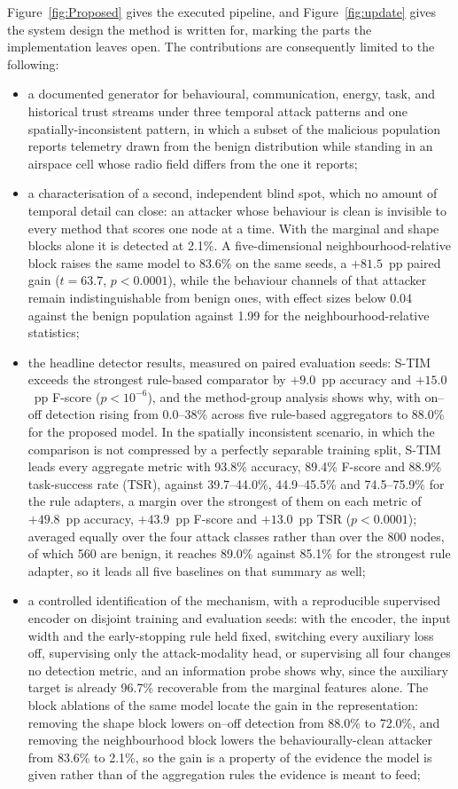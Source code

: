 \documentclass[notspecified,article,submit,moreauthors]{Definitions/mdpi}
\begin{document}
Figure~\ref{fig:Proposed} gives the executed pipeline, and Figure~\ref{fig:update} gives the system design the method is written for, marking the parts the implementation leaves open. The contributions are consequently limited to the following:

\begin{itemize}
    \item a documented generator for behavioural, communication, energy, task, and historical trust streams under three temporal attack patterns and one spatially-inconsistent pattern, in which a subset of the malicious population reports telemetry drawn from the benign distribution while standing in an airspace cell whose radio field differs from the one it reports;
    \item a characterisation of a second, independent blind spot, which no amount of temporal detail can close: an attacker whose behaviour is clean is invisible to every method that scores one node at a time. With the marginal and shape blocks alone it is detected at 2.1\%. A five-dimensional neighbourhood-relative block raises the same model to 83.6\% on the same seeds, a $+81.5$~pp paired gain ($t=63.7$, $p<0.0001$), while the behaviour channels of that attacker remain indistinguishable from benign ones, with effect sizes below 0.04 against the benign population against 1.99 for the neighbourhood-relative statistics;
    \item the headline detector results, measured on paired evaluation seeds: S-TIM exceeds the strongest rule-based comparator by $+9.0$~pp accuracy and $+15.0$~pp F-score ($p<10^{-6}$), and the method-group analysis shows why, with on--off detection rising from 0.0--38\% across five rule-based aggregators to 88.0\% for the proposed model. In the spatially inconsistent scenario, in which the comparison is not compressed by a perfectly separable training split, S-TIM leads every aggregate metric with 93.8\% accuracy, 89.4\% F-score and 88.9\% task-success rate (TSR), against 39.7--44.0\%, 44.9--45.5\% and 74.5--75.9\% for the rule adapters, a margin over the strongest of them on each metric of $+49.8$~pp accuracy, $+43.9$~pp F-score and $+13.0$~pp TSR ($p<0.0001$); averaged equally over the four attack classes rather than over the 800 nodes, of which 560 are benign, it reaches 89.0\% against 85.1\% for the strongest rule adapter, so it leads all five baselines on that summary as well;
    \item a controlled identification of the mechanism, with a reproducible supervised encoder on disjoint training and evaluation seeds: with the encoder, the input width and the early-stopping rule held fixed, switching every auxiliary loss off, supervising only the attack-modality head, or supervising all four changes no detection metric, and an information probe shows why, since the auxiliary target is already 96.7\% recoverable from the marginal features alone. The block ablations of the same model locate the gain in the representation: removing the shape block lowers on--off detection from 88.0\% to 72.0\%, and removing the neighbourhood block lowers the behaviourally-clean attacker from 83.6\% to 2.1\%, so the gain is a property of the evidence the model is given rather than of the aggregation rules the evidence is meant to feed;

\end{itemize}
\end{document}
